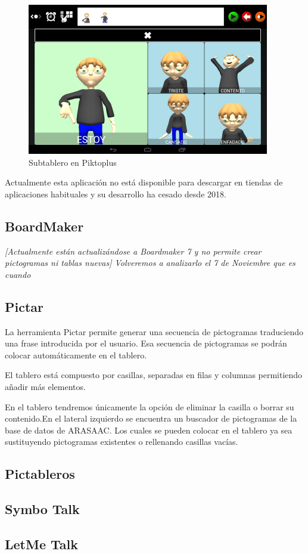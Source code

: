 \begin{figure}[h!]
	\centering
	\includegraphics[width=0.7\linewidth]{Imagenes/Bitmap/Piktoplus2}
	\caption[Subtablero Piktoplus]{Subtablero en Piktoplus}
	\label{fig:piktoplus2}
\end{figure}


Actualmente esta aplicación no está disponible para descargar en tiendas de aplicaciones  habituales y su desarrollo ha cesado desde 2018.

\subsection{BoardMaker}
\textit{[Actualmente están actualizándose a Boardmaker 7 y no permite crear pictogramas ni tablas nuevas] Volveremos a analizarlo el 7 de Noviembre que es cuando}

\subsection{Pictar}
La herramienta Pictar permite generar una secuencia de pictogramas traduciendo una frase introducida por el usuario. Esa secuencia de pictogramas se podrán colocar automáticamente en el tablero.


El tablero está compuesto por casillas, separadas en filas y columnas permitiendo añadir más elementos.

En el tablero tendremos únicamente la opción de eliminar la casilla o borrar su contenido.En el lateral izquierdo se encuentra un buscador de pictogramas de la base de datos de ARASAAC. Los cuales se pueden colocar en el tablero ya sea sustituyendo pictogramas existentes o rellenando casillas vacías.


\subsection{Pictableros}
\subsection{Symbo Talk}
\subsection{LetMe Talk}
